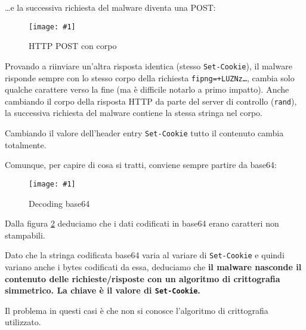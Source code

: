 \documentclass[
    a4paper, %
    11pt %
]{article}
\newcommand{\pic}[4]{\begin{figure}[H]
            \centering
            \texttt{[image: \#1]}
            \caption{#2}
            \label{fig:#1}
            \end{figure}}
\begin{document}
            \dots e la successiva richiesta del malware diventa una POST:

            \pic{httppost}{HTTP POST con corpo}{19cm}{5cm}

            Provando a riinviare un'altra risposta identica (stesso \texttt{Set-Cookie}), il malware risponde 
            sempre con lo stesso corpo della richiesta \texttt{fipng=+LUZNz\dots}, cambia solo qualche carattere
            verso la fine (ma è difficile notarlo a primo impatto). Anche cambiando il corpo della risposta HTTP da parte del server di controllo (\texttt{rand}), la successiva richiesta
            del malware contiene la stessa stringa nel corpo.

            Cambiando il valore dell'header entry \texttt{Set-Cookie} tutto il contenuto cambia totalmente.

            Comunque, per capire di cosa si tratti, conviene sempre partire da base64:

            \pic{decode}{Decoding base64}{17cm}{5cm}

            Dalla figura \ref{fig:decode} deduciamo che i dati codificati in base64 erano caratteri non stampabili.

            Dato che la stringa codificata base64 varia al variare di \texttt{Set-Cookie} e quindi variano anche
            i bytes codificati da essa, deduciamo che \textbf{il malware nasconde il contenuto delle richieste/risposte
            con un algoritmo di crittografia simmetrico. La chiave è il valore di \texttt{Set-Cookie}.}

            Il problema in questi casi è che non si conosce l'algoritmo di crittografia utilizzato.
\end{document}
